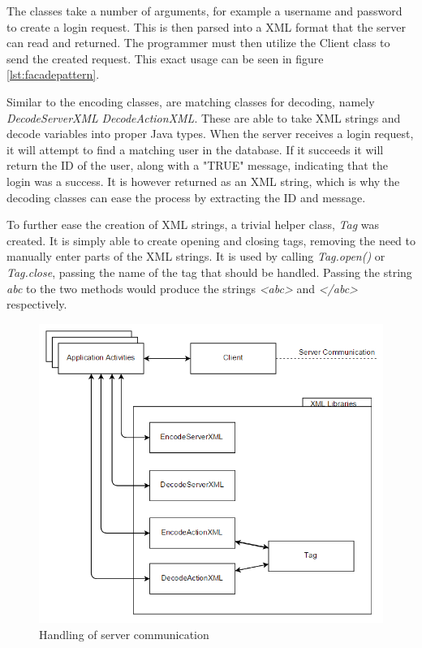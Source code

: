 The classes take a number of arguments, for example a username and password to create a login request. This is then parsed into a XML format that the server can read and returned. The programmer must then utilize the Client class to send the created request. This exact usage can be seen in figure \ref{lst:facadepattern}.

Similar to the encoding classes, are matching classes for decoding, namely \textit{DecodeServerXML} \textit{DecodeActionXML}. These are able to take XML strings and decode variables into proper Java types. When the server receives a login request, it will attempt to find a matching user in the database. If it succeeds it will return the ID of the user, along with a "TRUE" message, indicating that the login was a success. It is however returned as an XML string, which is why the decoding classes can ease the process by extracting the ID and message.

To further ease the creation of XML strings, a trivial helper class, \textit{Tag} was created. It is simply able to create opening and closing tags, removing the need to manually enter parts of the XML strings. It is used by calling \textit{Tag.open()} or \textit{Tag.close}, passing the name of the tag that should be handled. Passing the string \textit{abc} to the two methods would produce the strings \textit{<abc>} and \textit{</abc>} respectively.

\begin{figure}[H]
\centering
\includegraphics[width=\textwidth]{billeder/appcommunication.png}
\caption{Handling of server communication}
\label{fig:appcommunication}
\end{figure}
